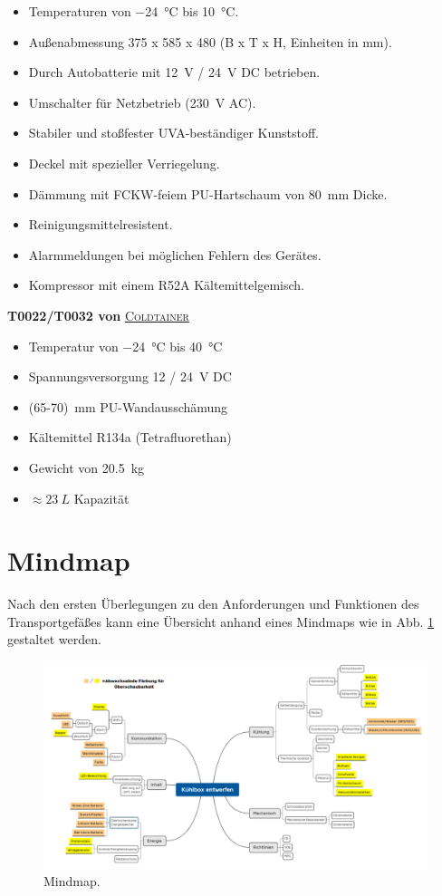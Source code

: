 	\begin{itemize}
		\item Temperaturen von \SI{-24}{\celsius} bis \SI{10}{\celsius}.
		\item Außenabmessung 375 x 585 x 480 (B x T x H, Einheiten in mm).
		\item Durch Autobatterie mit \SI{12}{\volt} / \SI{24}{\volt} DC betrieben.
		\item Umschalter für Netzbetrieb (\SI{230}{\volt} AC).
		\item Stabiler und stoßfester UVA-beständiger Kunststoff.
		\item Deckel mit spezieller Verriegelung.
		\item Dämmung mit FCKW-feiem PU-Hartschaum von \SI{80}{\milli\metre} Dicke.
		\item Reinigungsmittelresistent.
		\item Alarmmeldungen bei möglichen Fehlern des Gerätes.
		\item Kompressor mit einem R52A Kältemittelgemisch.
	\end{itemize}

	\textbf{T0022/T0032 von} \href{https://coldtainerusa.com/wp-content/uploads/2020/03/Product_Info_T0022-T0032_US_ColdtainerUSA-1.pdf}{\textsc{Coldtainer}}

	\begin{itemize}
		\item Temperatur von \SI{-24}{\celsius} bis \SI{40}{\celsius}
		\item Spannungsversorgung 12 / \SI{24}{\volt} DC %
		\item \SI{(65-70)}{\milli\metre} PU-Wandausschämung
		\item Kältemittel R134a (Tetrafluorethan)
		\item Gewicht von \SI{20,5}{\kilo\gram}
		\item \(\approx \SI{23}{L}\) Kapazität
	\end{itemize}

	\section{Mindmap}
	Nach den ersten Überlegungen zu den Anforderungen und Funktionen des Transportgefäßes kann eine Übersicht anhand eines Mindmaps wie in Abb. \ref{fig:mindmap} gestaltet werden.
	\begin{figure}[H]
		\centering
		\includegraphics[angle=90,width=0.8\linewidth]{assets/skizzen/Mindmap}
		\caption{Mindmap.}
		\label{fig:mindmap}
	\end{figure}

